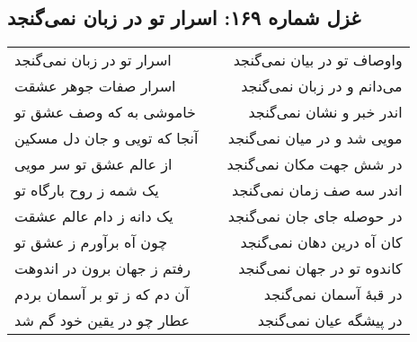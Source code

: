 \begin{center}
\section*{غزل شماره ۱۶۹: اسرار تو در زبان نمی‌گنجد}
\label{sec:169}
\begin{longtable}{l p{0.5cm} r}
اسرار تو در زبان نمی‌گنجد
&&
واوصاف تو در بیان نمی‌گنجد
\\
اسرار صفات جوهر عشقت
&&
می‌دانم و در زبان نمی‌گنجد
\\
خاموشی به که وصف عشق تو
&&
اندر خبر و نشان نمی‌گنجد
\\
آنجا که تویی و جان دل مسکین
&&
مویی شد و در میان نمی‌گنجد
\\
از عالم عشق تو سر مویی
&&
در شش جهت مکان نمی‌گنجد
\\
یک شمه ز روح بارگاه تو
&&
اندر سه صف زمان نمی‌گنجد
\\
یک دانه ز دام عالم عشقت
&&
در حوصله جای جان نمی‌گنجد
\\
چون آه برآورم ز عشق تو
&&
کان آه درین دهان نمی‌گنجد
\\
رفتم ز جهان برون در اندوهت
&&
کاندوه تو در جهان نمی‌گنجد
\\
آن دم که ز تو بر آسمان بردم
&&
در قبهٔ آسمان نمی‌گنجد
\\
عطار چو در یقین خود گم شد
&&
در پیشگه عیان نمی‌گنجد
\\
\end{longtable}
\end{center}
